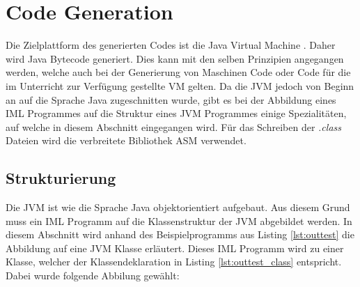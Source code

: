 \section{Code Generation}

Die Zielplattform des generierten Codes ist die Java Virtual Machine \cite{ORACLE:JVM}. Daher
wird Java Bytecode generiert. Dies kann mit den selben Prinzipien angegangen werden, welche auch
bei der Generierung von Maschinen Code oder Code für die im Unterricht zur Verfügung gestellte 
VM gelten. Da die JVM jedoch von Beginn an auf die Sprache Java zugeschnitten wurde, gibt es bei
der Abbildung eines IML Programmes auf die Struktur eines JVM Programmes einige Spezialitäten, 
auf welche in diesem Abschnitt eingegangen wird. Für das Schreiben der \textit{.class} Dateien wird
die verbreitete Bibliothek ASM \cite{OW2:ASM} verwendet.

\subsection {Strukturierung}

Die JVM ist wie die Sprache Java objektorientiert aufgebaut. Aus diesem Grund muss ein 
IML Programm auf die Klassenstruktur der JVM abgebildet werden. In diesem Abschnitt wird 
anhand des Beispielprogramms aus Listing \ref{lst:outtest} die Abbildung auf eine JVM Klasse
erläutert. Dieses IML Programm wird zu einer Klasse, welcher der Klassendeklaration in Listing 
\ref{lst:outtest_class} entspricht. Dabei wurde folgende Abbilung gewählt:

